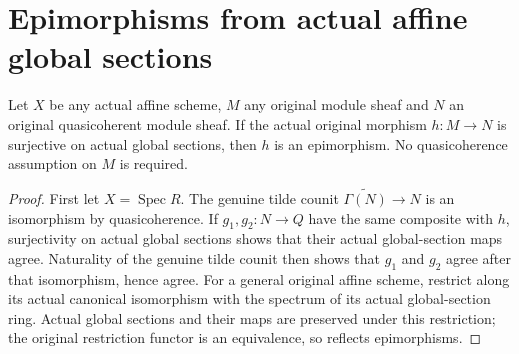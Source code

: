 \section{Epimorphisms from actual affine global sections}

\begin{lemma}
\label{lem:actual-affine-module-epi-of-sections}
\leanok
Let $X$ be any actual affine scheme, $M$ any original module sheaf and $N$
an original quasicoherent module sheaf. If the actual original morphism
$h:M\to N$ is surjective on actual global sections, then $h$ is an
epimorphism. No quasicoherence assumption on $M$ is required.
\end{lemma}
\begin{proof}
First let $X=\operatorname{Spec}R$. The genuine tilde counit
$\widetilde{\Gamma(N)}\to N$ is an isomorphism by quasicoherence. If
$g_1,g_2:N\to Q$ have the same composite with $h$, surjectivity on actual
global sections shows that their actual global-section maps agree.
Naturality of the genuine tilde counit then shows that $g_1$ and $g_2$
agree after that isomorphism, hence agree. For a general original affine
scheme, restrict along its actual canonical isomorphism with the spectrum
of its actual global-section ring. Actual global sections and their maps
are preserved under this restriction; the original restriction functor is
an equivalence, so reflects epimorphisms.
\end{proof}
